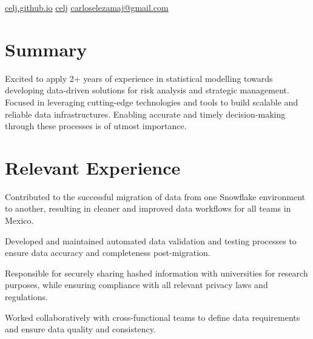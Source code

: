 \documentclass[]{resume}
\begin{document}

{\contactline
	{\href{https://celj.github.io}{celj.github.io}}
	{\href{https://www.github.com/celj}{celj}}
	{\href{mailto:carloselezamaj@gmail.com}{carloselezamaj@gmail.com}}
}


\begin{minipage}[t]{0.70\textwidth}


	\section{Summary}

	Excited to apply 2+ years of experience in statistical modelling towards developing data-driven solutions for risk analysis and strategic management. Focused in leveraging cutting-edge technologies and tools to build scalable and reliable data infrastructures. Enabling accurate and timely decision-making through these processes is of utmost importance.


	\section{Relevant Experience}

	\vspace{\topsep}
	\begin{tightemize}
		\sectionsep
		\sectionsep
		\item Contributed to the successful migration of data from one Snowflake environment to another, resulting in cleaner and improved data workflows for all teams in Mexico.
		\item Developed and maintained automated data validation and testing processes to ensure data accuracy and completeness post-migration.
		\item Responsible for securely sharing hashed information with universities for research purposes, while ensuring compliance with all relevant privacy laws and regulations.
		\item Worked collaboratively with cross-functional teams to define data requirements and ensure data quality and consistency.
	\end{tightemize}
	\sectionsep


\end{minipage}
\end{document}
